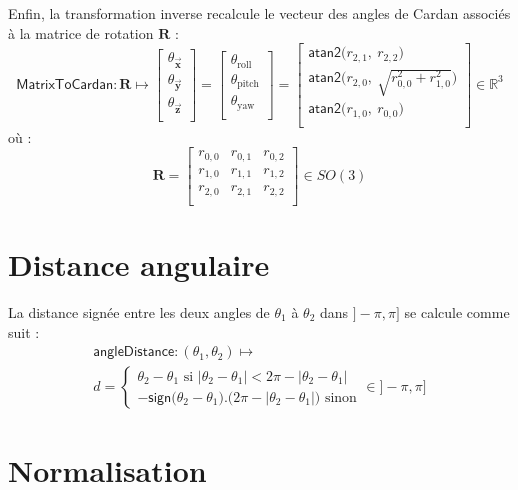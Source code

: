 Enfin, la transformation inverse recalcule le vecteur des angles de Cardan associés 
à la matrice de rotation $\bm{R}$ :
$$
\mathsf{MatrixToCardan} : \bm{R} \longmapsto
\begin{bmatrix}
\theta_{\vec{\bm{x}}} \\
\theta_{\vec{\bm{y}}} \\
\theta_{\vec{\bm{z}}} \\
\end{bmatrix}
= 
\begin{bmatrix}
\theta_{\text{roll}} \\
\theta_{\text{pitch}} \\
\theta_{\text{yaw}} \\
\end{bmatrix}
= 
\begin{bmatrix}
\mathsf{atan2}\big(r_{2,1},~r_{2,2}\big) \\
\mathsf{atan2}\big(r_{2,0},~\sqrt{r_{0,0}^2+r_{1,0}^2}\big) \\
\mathsf{atan2}\big(r_{1,0},~r_{0,0}\big) \\
\end{bmatrix}
\in \mathbb{R}^3
$$
où :
$$
\bm{R} = 
\begin{bmatrix}
r_{0,0} & r_{0,1} & r_{0,2} \\
r_{1,0} & r_{1,1} & r_{1,2} \\
r_{2,0} & r_{2,1} & r_{2,2} \\
\end{bmatrix}
\in SO(3)
$$

\section{Distance angulaire\label{sec:distance_angle}}

La distance signée entre les deux angles de $\theta_1$ à $\theta_2$ dans
$]-\pi,\pi]$ se calcule comme suit :
\begin{gather*}
\mathsf{angleDistance} : (\theta_1,\theta_2) \longmapsto\\
d = 
\begin{cases}
    \theta_2-\theta_1 \text{ si }|\theta_2 - \theta_1| < 2\pi - |\theta_2 - \theta_1| \\
    -\mathsf{sign}\big(\theta_2 - \theta_1 \big).\big(2\pi - |\theta_2-\theta_1|\big) \text{ sinon}
\end{cases}
\in ]-\pi,\pi]
\end{gather*}

\section{Normalisation\label{bound_angle}}

